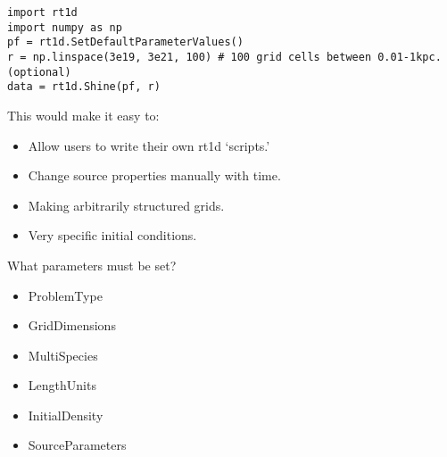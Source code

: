 \documentclass[letterpaper,titlepage,12pt]{article}
\numberwithin{equation}{section}
\begin{document}
\begin{verbatim}
import rt1d
import numpy as np
pf = rt1d.SetDefaultParameterValues()
r = np.linspace(3e19, 3e21, 100) # 100 grid cells between 0.01-1kpc. (optional)
data = rt1d.Shine(pf, r)    
\end{verbatim}    

This would make it easy to:
\begin{itemize}
    \item Allow users to write their own rt1d `scripts.'
    \item Change source properties manually with time.
    \item Making arbitrarily structured grids.
    \item Very specific initial conditions.
\end{itemize}    


What parameters must be set?
\begin{itemize}
    \item ProblemType
    \item GridDimensions
    \item MultiSpecies
    \item LengthUnits
    \item InitialDensity
    \item SourceParameters
\end{itemize}


\newpage


\end{document}
